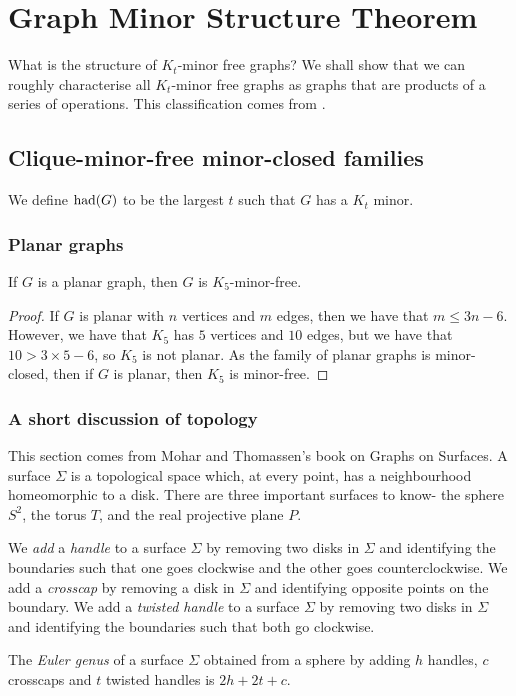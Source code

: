 
\section{Graph Minor Structure Theorem}\label{sec:Kt_Minor_Free}
What is the structure of $K_t$-minor free graphs? We shall show that we can roughly characterise all $K_t$-minor free graphs as graphs that are products of a series of operations. This classification comes from \cite{robertsonGraphMinorsXVI2003}.
\subsection{Clique-minor-free minor-closed families}\label{ssec:Kt_Minor_Closed_families}
We define $\text{had}(G)$ to be the largest $t$ such that $G$ has a $K_t$ minor. 
\subsubsection{Planar graphs}\label{sssec:K_5-free_Planar}
\begin{theorem}\label{thm:K5_Free_Planar}
	If $G$ is a planar graph, then $G$ is $K_5$-minor-free.
\end{theorem}
\begin{proof}
	If $G$ is planar with $n$ vertices and $m$ edges, then we have that $m \leq 3n -6$. However, we have that $K_5$ has $5$ vertices and $10$ edges, but we have that $ 10 > 3 \times 5 - 6$, so $K_5$ is not planar. As the family of planar graphs is minor-closed, then if $G$ is planar, then $K_5$ is minor-free.
\end{proof}

\subsubsection{A short discussion of topology}\label{sssec:topology}
This section comes from Mohar and Thomassen's book on Graphs on Surfaces. \cite{moharGraphsSurfaces2001} A surface $\Sigma$ is a topological space which, at every point, has a neighbourhood homeomorphic to a disk. There are three important surfaces to know- the sphere $S^2$, the torus $T$, and the real projective plane $P$.
\par
We \textit{add} a \textit{handle} to a surface $\Sigma$ by removing two disks in $\Sigma$ and identifying the boundaries such that one goes clockwise and the other goes counterclockwise. We add a \textit{crosscap} by removing a disk in $\Sigma$ and identifying opposite points on the boundary. We add a \textit{twisted handle} to a surface $\Sigma$ by removing two disks in $\Sigma$ and identifying the boundaries such that both go clockwise.
\par
\begin{definition}
	The \textit{Euler genus} of a surface $\Sigma$ obtained from a sphere by adding $h$ handles, $c$ crosscaps and $t$ twisted handles is $2h + 2t + c$.
\end{definition}

